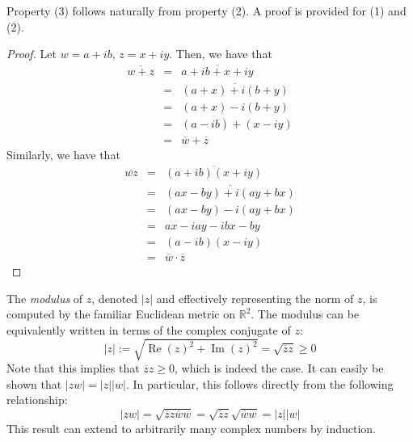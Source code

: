 Property (3) follows naturally from property (2). A proof is provided for (1) and (2). \begin{proof}
    Let $w=a+ib$, $z=x+iy$. Then, we have that \begin{eqnarray*}
        \overline{w+z} &=& \overline{a+ib+x+iy}\\
        &=& \overline{(a+x) + i(b+y)}\\
        &=& (a+x) - i(b+y)\\
        &=& (a-ib) + (x-iy)\\
        &=& \overline{w} + \overline{z}
    \end{eqnarray*} Similarly, we have that \begin{eqnarray*}
        \overline{wz} &=& \overline{(a+ib)(x+iy)}\\
        &=& \overline{(ax-by)+i(ay+bx)}\\
        &=& (ax-by) - i(ay+bx)\\
        &=& ax -iay -ibx -by\\
        &=& (a-ib)(x-iy)\\
        &=& \overline{w}\cdot\overline{z}
    \end{eqnarray*}
\end{proof}

The \textit{modulus} of $z$, denoted $|z|$ and effectively representing the norm of $z$, is computed by the familiar Euclidean metric on $\mathbb{R}^2$. The modulus can be equivalently written in terms of the complex conjugate of $z$: \[|z|:=\sqrt{\operatorname{Re}(z)^2+\operatorname{Im}(z)^2} = \sqrt{\overline{z}z} \geq 0\] Note that this implies that $\overline{z}z\geq 0$, which is indeed the case. It can easily be shown that $|zw| = |z||w|$. In particular, this follows directly from the following relationship: \[|zw| = \sqrt{\overline{z}z\overline{w}w} = \sqrt{\overline{z}z}\sqrt{\overline{w}w} = |z||w|\] This result can extend to arbitrarily many complex numbers by induction.

